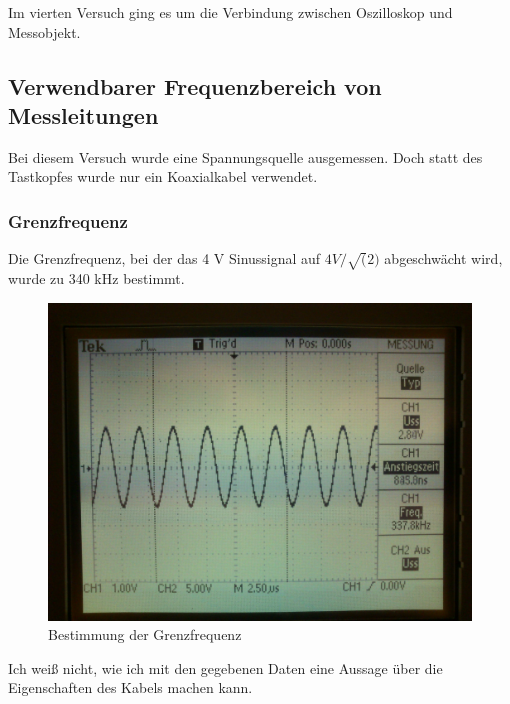 

\setcounter{section}{4}
Im vierten Versuch ging es um die Verbindung zwischen Oszilloskop und Messobjekt.

\subsection{Verwendbarer Frequenzbereich von Messleitungen}
Bei diesem Versuch wurde eine Spannungsquelle ausgemessen. Doch statt des Tastkopfes wurde nur ein Koaxialkabel verwendet.

\subsubsection*{Grenzfrequenz}
Die Grenzfrequenz, bei der das 4 V Sinussignal auf $4V/\sqrt(2)$ abgeschwächt wird, wurde zu 340 kHz bestimmt.
\begin{figure}[H]
	\centering
	\includegraphics[width=\linewidth]{versuch4/oszi/DSC_0323.JPG}
	\caption{Bestimmung der Grenzfrequenz}
\end{figure}
Ich weiß nicht, wie ich mit den gegebenen Daten eine Aussage über die Eigenschaften des Kabels machen kann.

